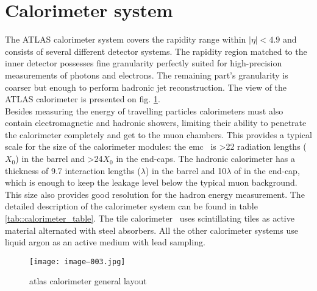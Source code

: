         \section{Calorimeter system }
		The ATLAS calorimeter system covers the rapidity range within $|\eta| < 4.9$ and consists of several different detector systems. The rapidity region matched to the inner detector possesses fine granularity perfectly suited for high-precision measurements of photons and electrons. The remaining part's granularity is coarser but enough to perform hadronic jet reconstruction. The view of the ATLAS calorimeter is presented on fig. \ref{fig::calorimeter_layout}.\\
		Besides measuring the energy of travelling particles calorimeters must also contain electromagnetic and hadronic showers, limiting their ability to penetrate the calorimeter completely and get to the muon chambers. This provides a typical scale for the size of the calorimeter modules: the \gls{emc}~\cite{LAr_calo} is >22 radiation lengths ($X_0$) in the barrel and >24$X_0$ in the end-caps. The hadronic calorimeter has a thickness of 9.7 interaction lengths ($\lambda$) in the barrel and 10$\lambda$ of in the end-cap, which is enough to keep the leakage level below the typical muon background. This size also provides good resolution for the hadron energy measurement. The detailed description of the calorimeter system can be found in table \ref{tab::calorimeter_table}.
		The tile calorimeter~\cite{Tile_calo} uses scintillating tiles as active material alternated with steel absorbers. All the other calorimeter systems use liquid argon as an active medium with lead sampling.
        \begin{figure}[htpb]
			\texttt{[image: image--003.jpg]}
			\caption{ \gls{atlas} calorimeter general layout}
			\label{fig::calorimeter_layout}
		\end{figure}
